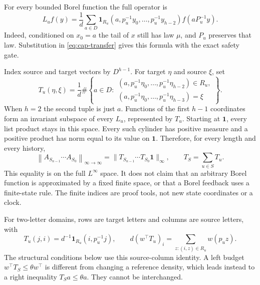 \documentclass[11pt,reqno]{amsart}
\numberwithin{equation}{section}
\theoremstyle{definition}
\newcommand{\one}{\mathbf 1}
\newcommand{\opnorm}[1]{\left\|#1\right\|_{\infty\to\infty}}
\begin{document}
For every bounded Borel function the full operator is
\begin{equation}\label{eq:cyl-operator}
 L_uf(y)=\frac1d\sum_{a\in D}
 \one_{R_u}(a,p_u^{-1}y_0,\ldots,p_u^{-1}y_{h-2})
 f(aP_u^{-1}y).
\end{equation}
Indeed, conditioned on $x_0=a$ the tail of $x$ still has law $\mu$,
and $P_u$ preserves that law. Substitution in
\eqref{eq:cap-transfer} gives this formula with the exact safety gate.

Index source and target vectors by $D^{h-1}$. For target $\eta$
and source $\xi$, set
\begin{equation}\label{eq:cyl-matrix}
 T_u(\eta,\xi)=\frac1d\#\left\{a\in D:
 \begin{array}{l}
 (a,p_u^{-1}\eta_0,\ldots,p_u^{-1}\eta_{h-2})\in R_u,\\
 (a,p_u^{-1}\eta_0,\ldots,p_u^{-1}\eta_{h-3})=\xi
 \end{array}\right\}.
\end{equation}
When $h=2$ the second tuple is just $a$.
Functions of the first $h-1$ coordinates form an invariant subspace
of every $L_u$, represented by $T_u$. Starting at $\one$, every
list product stays in this space. Every such cylinder has positive
measure and a positive product has norm equal to its value on $\one$.
Therefore, for every length and every history,
\begin{equation}\label{eq:cyl-fullnorm}
 \opnorm{A_{S_{n-1}}\cdots A_{S_0}}
 =\|T_{S_{n-1}}\cdots T_{S_0}\one\|_\infty,
 \qquad T_S=\sum_{u\in S}T_u.
\end{equation}
This equality is on the full $L^\infty$ space. It does not claim
that an arbitrary Borel function is approximated by a fixed finite
space, or that a Borel feedback uses a finite-state rule. The finite
indices are proof tools, not new state coordinates or a clock.

For two-letter domains, rows are target letters and columns are
source letters, with
\begin{equation}\label{eq:cyl-two}
 T_u(j,i)=d^{-1}\one_{R_u}(i,p_u^{-1}j),\qquad
 d(w^\top T_u)_i=\sum_{z:(i,z)\in R_u}w(p_uz).
\end{equation}
The structural conditions below use this source-column identity.
A left budget $w^\top T_S\le\theta w^\top$ is different from
changing a reference density, which leads instead to a right
inequality $T_Sa\le\theta a$. They cannot be interchanged.
\end{document}
